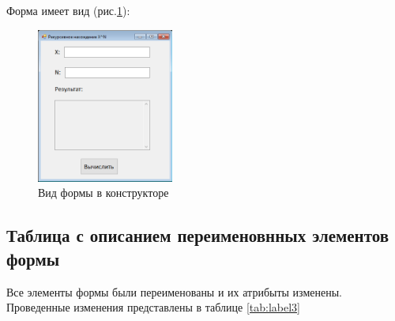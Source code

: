 Форма имеет вид (рис.\ref{fig:FormInConstruct3}):

\begin{figure}[!h]
    \centering
    \includegraphics[width = 0.4\textwidth]{images/Task3/FormInConstructor.png}
    \caption{Вид формы в конструкторе}
    \label{fig:FormInConstruct3}
\end{figure}

\newpage

\subsection{Таблица с описанием переименовнных элементов формы}

Все элементы формы были переименованы и их атрибыты изменены. Проведенные изменения представлены в таблице \ref{tab:label3}

